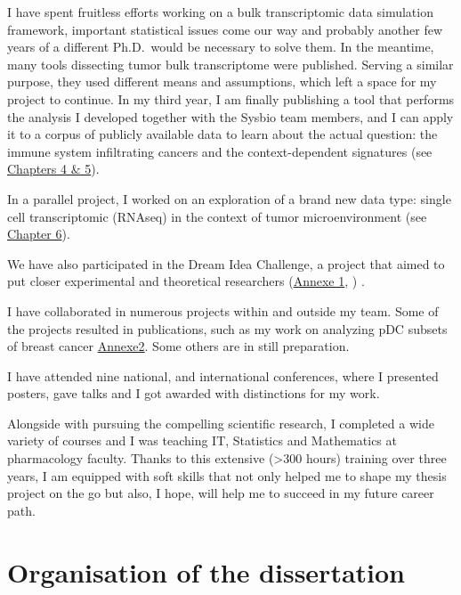 \documentclass[12pt,]{book}
\theoremstyle{definition}
\theoremstyle{definition}
\theoremstyle{definition}
\theoremstyle{remark}
\begin{document}
I have spent fruitless efforts working on a bulk transcriptomic data
simulation framework, important statistical issues come our way and
probably another few years of a different Ph.D.~would be necessary to
solve them. In the meantime, many tools dissecting tumor bulk
transcriptome were published. Serving a similar purpose, they used
different means and assumptions, which left a space for my project to
continue. In my third year, I am finally publishing a tool that performs
the analysis I developed together with the Sysbio team members, and I
can apply it to a corpus of publicly available data to learn about the
actual question: the immune system infiltrating cancers and the
context-dependent signatures (see \protect\hyperlink{deconica}{Chapters
4 \& 5}).

In a parallel project, I worked on an exploration of a brand new data
type: single cell transcriptomic (RNAseq) in the context of tumor
microenvironment (see \protect\hyperlink{map}{Chapter 6}).

We have also participated in the Dream Idea Challenge, a project that
aimed to put closer experimental and theoretical researchers
(\protect\hyperlink{annex1}{Annexe 1}, \citep{Azencott2017}) .

I have collaborated in numerous projects within and outside my team.
Some of the projects resulted in publications, such as my work on
analyzing pDC subsets of breast cancer
\protect\hyperlink{annexe2}{Annexe2}. Some others are in still
preparation.

I have attended nine national, and international conferences, where I
presented posters, gave talks and I got awarded with distinctions for my
work.

Alongside with pursuing the compelling scientific research, I completed
a wide variety of courses and I was teaching IT, Statistics and
Mathematics at pharmacology faculty. Thanks to this extensive
(\textgreater{}300 hours) training over three years, I am equipped with
soft skills that not only helped me to shape my thesis project on the go
but also, I hope, will help me to succeed in my future career path.

\hypertarget{organisation-of-the-dissertation}{%
\chapter*{Organisation of the
dissertation}\label{organisation-of-the-dissertation}}
\end{document}
